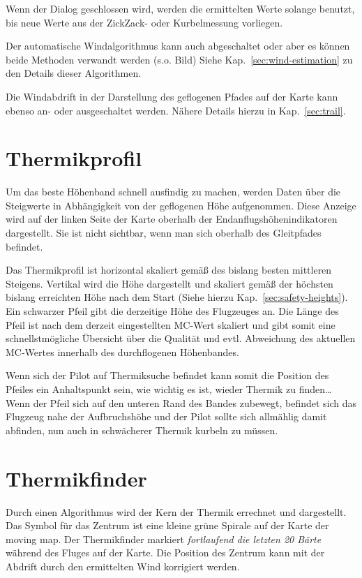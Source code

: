 Wenn der Dialog geschlossen wird, werden die ermittelten Werte solange benutzt,
 bis neue Werte aus der ZickZack- oder Kurbelmessung vorliegen.

Der automatische Windalgorithmus kann auch abgeschaltet oder aber es können
beide Methoden verwandt werden (s.o. Bild) Siehe Kap.~\ref{sec:wind-estimation}
zu den Details dieser Algorithmen.

Die Windabdrift in der Darstellung des geflogenen Pfades  auf der Karte kann ebenso an-
oder ausgeschaltet werden. Nähere Details hierzu in Kap.~\ref{sec:trail}.
\section{Thermikprofil}
Um das beste Höhenband schnell ausfindig zu machen, werden Daten über die Steigwerte in
Abhängigkeit von der geflogenen Höhe aufgenommen.
Diese Anzeige wird auf der linken Seite der Karte oberhalb der Endanflugshöhenindikatoren dargestellt.
Sie ist nicht sichtbar, wenn man sich oberhalb des Gleitpfades befindet.

Das Thermikprofil ist horizontal skaliert gemäß des bislang besten mittleren Steigens.
Vertikal wird die Höhe dargestellt und skaliert gemäß der höchsten bislang erreichten Höhe nach dem Start
(Siehe hierzu Kap.~\ref{sec:safety-heights}). Ein schwarzer Pfeil gibt die derzeitige Höhe des Flugzeuges an.
Die Länge des  Pfeil ist nach dem derzeit eingestellten MC-Wert skaliert und gibt somit eine schnellstmögliche Übersicht über die Qualität und evtl. Abweichung des aktuellen MC-Wertes innerhalb des durchflogenen Höhenbandes.

Wenn sich der Pilot auf Thermiksuche befindet kann somit die Position des Pfeiles ein Anhaltspunkt sein,
wie wichtig es ist, wieder Thermik zu finden\dots
Wenn der Pfeil sich auf den unteren Rand des Bandes zubewegt, befindet sich das Flugzeug nahe der Aufbruchshöhe und der Pilot sollte sich allmählig damit abfinden, nun auch in schwächerer Thermik kurbeln zu müssen.

\section{Thermikfinder}
Durch einen Algorithmus wird der Kern der Thermik errechnet und dargestellt.
Das Symbol für das Zentrum ist eine kleine grüne Spirale auf der Karte der moving map.
Der Thermikfinder markiert \textit{fortlaufend  die letzten 20 Bärte} während des Fluges auf der Karte.
Die Position des Zentrum kann mit der Abdrift durch den ermittelten Wind korrigiert werden.

